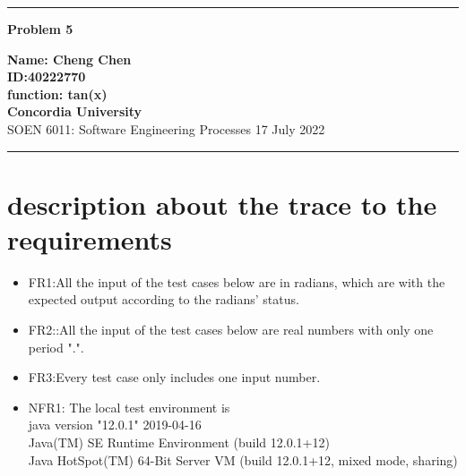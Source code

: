 \documentclass[10pt,a4paper,twoside]{article}
\begin{document}
\begin{center}
\hrule

\vspace{.4cm}
{\bf {\Huge Problem 5}}
\vspace{.2cm}
\end{center}
{\bf Name: Cheng Chen}  \\
{\bf ID:40222770}\\
{\bf function: tan(x)}\\
{\bf Concordia University}\\
SOEN 6011: Software Engineering Processes {\bf  } \hspace{\fill}  17 July  2022 \\
\hrule






\section{description about the trace to the requirements}
\begin{itemize}
    \item FR1:All the input of the test cases below are in radians, which are with the expected output according to the radians' status.
    \item FR2::All the input of the test cases below are real numbers with only one period ".".
    \item FR3:Every test case only includes one input number.
    \item NFR1: The local test environment is\\
    java version "12.0.1" 2019-04-16\\
Java(TM) SE Runtime Environment (build 12.0.1+12)\\
Java HotSpot(TM) 64-Bit Server VM (build 12.0.1+12, mixed mode, sharing)
\end{itemize}
\end{document}
